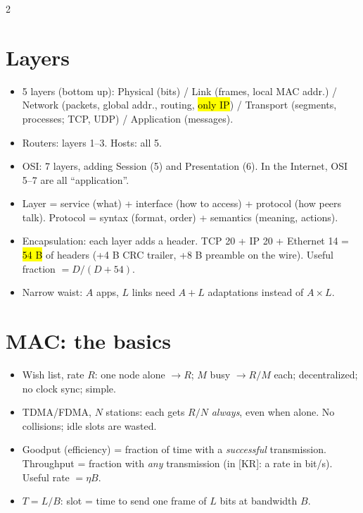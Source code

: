 \begin{multicols}{2}

\section{Layers}
\begin{itemize}
  \item 5 layers (bottom up): Physical (bits) / Link (frames, local MAC addr.) / Network (packets, global addr., routing, \hl{only IP}) / Transport (segments, processes; TCP, UDP) / Application (messages).
  \item Routers: layers 1--3. Hosts: all 5.
  \item OSI: 7 layers, adding Session (5) and Presentation (6). In the Internet, OSI 5--7 are all ``application''.
  \item Layer = service (what) + interface (how to access) + protocol (how peers talk). Protocol = syntax (format, order) + semantics (meaning, actions).
  \item Encapsulation: each layer adds a header. TCP 20 + IP 20 + Ethernet 14 = \hl{54 B} of headers (+4 B CRC trailer, +8 B preamble on the wire). Useful fraction $=D/(D+54)$.
  \item Narrow waist: $A$ apps, $L$ links need $A+L$ adaptations instead of $A\times L$.
\end{itemize}

\section{MAC: the basics}
\begin{itemize}
  \item Wish list, rate $R$: one node alone $\to R$; $M$ busy $\to R/M$ each; decentralized; no clock sync; simple.
  \item TDMA/FDMA, $N$ stations: each gets $R/N$ \emph{always}, even when alone. No collisions; idle slots are wasted.
  \item Goodput (efficiency) = fraction of time with a \emph{successful} transmission. Throughput = fraction with \emph{any} transmission (in [KR]: a rate in bit/s). Useful rate $=\eta B$.
  \item $T=L/B$: slot = time to send one frame of $L$ bits at bandwidth $B$.
\end{itemize}


\end{multicols}
